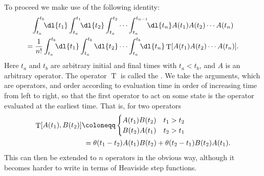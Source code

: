 \documentclass[fleqn]{NotesClass}
\newcommand{\heaviside}{\theta}
\DeclareMathOperator{\timeOrdering}{T}
\begin{document}
    To proceed we make use of the following identity:
    \begin{multline}
        \int_{t_a}^{t_b} \!\! \dl{t_1} \int_{t_a}^{t_1} \!\! \dl{t_2} \int_{t_a}^{t_2} \dotsm \int_{t_a}^{t_{n-1}} \!\! \dl{t_n} A(t_1)A(t_2) \dotsb A(t_n)\\
        = \frac{1}{n!} \int_{t_a}^{t_b} \!\! \dl{t_1} \int_{t_a}^{t_b} \dl{t_2} \dotsm \int_{t_a}^{t_b} \!\! \dl{t_n} \timeOrdering[A(t_1)A(t_2) \dotsm A(t_n)].
    \end{multline}
    Here \(t_a\) and \(t_b\) are arbitrary initial and final times with \(t_a < t_b\), and \(A\) is an arbitrary operator.
    The operator \(\timeOrdering\) is called the .
    We take the arguments, which are operators, and order according to evaluation time in order of increasing time from left to right, so that the first operator to act on some state is the operator evaluated at the earliest time.
    That is, for two operators
    \begin{align}
        \timeOrdering[A(t_1), B(t_2)] &\coloneqq
        \begin{cases}
            A(t_1)B(t_2) & t_1 > t_2\\
            B(t_2)A(t_1) & t_2 > t_1
        \end{cases}
        \\
        &\hphantom{:}= \heaviside(t_1 - t_2) A(t_1)B(t_2) + \heaviside(t_2 - t_1) B(t_2)A(t_1).
    \end{align}
    This can then be extended to \(n\) operators in the obvious way, although it becomes harder to write in terms of Heaviside step functions.
    
\end{document}
